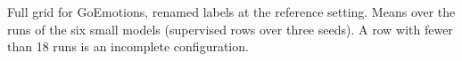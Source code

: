 \begin{table}[t]
  \centering
  \footnotesize
  
  \caption{Full grid for GoEmotions, renamed labels at the reference setting. Means over the runs of the six small models (supervised rows over three seeds). A row with fewer than 18 runs is an incomplete configuration.}
  \label{tab:grid_go_relabel}
\end{table}
